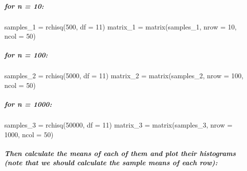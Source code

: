 \documentclass[
]{article}
\newenvironment{Shaded}{\begin{snugshade}}{\end{snugshade}}
\newcommand{\AttributeTok}[1]{\textcolor[rgb]{0.77,0.63,0.00}{#1}}
\newcommand{\DecValTok}[1]{\textcolor[rgb]{0.00,0.00,0.81}{#1}}
\newcommand{\FunctionTok}[1]{\textcolor[rgb]{0.00,0.00,0.00}{#1}}
\newcommand{\NormalTok}[1]{#1}
\newcommand{\OtherTok}[1]{\textcolor[rgb]{0.56,0.35,0.01}{#1}}
\begin{document}
\hypertarget{for-n-10}{%
\subparagraph{for n = 10:}\label{for-n-10}}

\begin{Shaded}
\begin{Highlighting}[]
\NormalTok{samples\_1 }\OtherTok{=} \FunctionTok{rchisq}\NormalTok{(}\DecValTok{500}\NormalTok{, }\AttributeTok{df =} \DecValTok{11}\NormalTok{)}
\NormalTok{matrix\_1 }\OtherTok{=}  \FunctionTok{matrix}\NormalTok{(samples\_1, }\AttributeTok{nrow =} \DecValTok{10}\NormalTok{, }\AttributeTok{ncol =} \DecValTok{50}\NormalTok{)}
\end{Highlighting}
\end{Shaded}

\hypertarget{for-n-100}{%
\subparagraph{for n = 100:}\label{for-n-100}}

\begin{Shaded}
\begin{Highlighting}[]
\NormalTok{samples\_2 }\OtherTok{=} \FunctionTok{rchisq}\NormalTok{(}\DecValTok{5000}\NormalTok{, }\AttributeTok{df =} \DecValTok{11}\NormalTok{)}
\NormalTok{matrix\_2 }\OtherTok{=}  \FunctionTok{matrix}\NormalTok{(samples\_2, }\AttributeTok{nrow =} \DecValTok{100}\NormalTok{, }\AttributeTok{ncol =} \DecValTok{50}\NormalTok{)}
\end{Highlighting}
\end{Shaded}

\hypertarget{for-n-1000}{%
\subparagraph{for n = 1000:}\label{for-n-1000}}

\begin{Shaded}
\begin{Highlighting}[]
\NormalTok{samples\_3 }\OtherTok{=} \FunctionTok{rchisq}\NormalTok{(}\DecValTok{50000}\NormalTok{, }\AttributeTok{df =} \DecValTok{11}\NormalTok{)}
\NormalTok{matrix\_3 }\OtherTok{=}  \FunctionTok{matrix}\NormalTok{(samples\_3, }\AttributeTok{nrow =} \DecValTok{1000}\NormalTok{, }\AttributeTok{ncol =} \DecValTok{50}\NormalTok{)}
\end{Highlighting}
\end{Shaded}

\hypertarget{then-calculate-the-means-of-each-of-them-and-plot-their-histograms-note-that-we-should-calculate-the-sample-means-of-each-row}{%
\subparagraph{Then calculate the means of each of them and plot their
histograms (note that we should calculate the sample means of each
row):}\label{then-calculate-the-means-of-each-of-them-and-plot-their-histograms-note-that-we-should-calculate-the-sample-means-of-each-row}}
\end{document}
